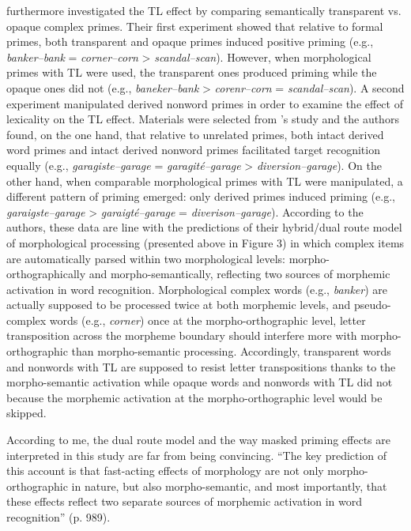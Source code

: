 \documentclass[output=paper]{langsci/langscibook}
\begin{document}
%
\citet{DiependaeleMorrisEtAl2013} %
%
furthermore investigated the TL effect by
comparing semantically transparent vs. opaque complex primes. Their first experiment showed that relative to formal primes, both transparent and opaque
primes induced positive priming (e.g., \emph{banker--bank} =
\emph{corner--corn} \textgreater{} \emph{scandal--scan}). However, when
morphological primes with TL were used, the transparent ones produced
priming while the opaque ones did not (e.g., \emph{baneker--bank} \textgreater{} \emph{corenr--corn} =
\emph{scandal--scan}). A second experiment manipulated derived nonword
primes in order to examine the effect of lexicality on the TL effect.
Materials were selected from %
\citeauthor{LongtinMeunier2005}'s \citeyear{LongtinMeunier2005} study %
%
%
 and the
authors found, on the one hand, that relative to unrelated primes, both
intact derived word primes and intact derived nonword primes 
facilitated target recognition equally (e.g., \emph{garagiste--garage} =
\emph{garagité--garage} \textgreater{} \emph{diversion--garage}). On the
other hand, when comparable morphological primes with TL were
manipulated, a different pattern of priming emerged: only derived primes
induced priming (e.g., \emph{garaigste--garage} \textgreater{}
\emph{garaigté--garage} = \emph{diverison--garage}). According to the
authors, these data are line with the predictions of their hybrid/dual
route model of morphological processing (presented above in Figure 3) in
which complex items are automatically parsed within two morphological
levels: morpho-orthographically and morpho-semantically, reflecting two
sources of morphemic activation in word recognition. Morphological
complex words (e.g., \emph{banker}) are actually supposed to be
processed twice at both morphemic levels, and pseudo-complex words (e.g.,
\emph{corner}) once at the morpho-orthographic level, letter
transposition across the morpheme boundary should interfere more with
morpho-orthographic  than morpho-semantic processing.
Accordingly, transparent words and nonwords with TL are supposed to
resist letter transpositions thanks to the morpho-semantic activation
while opaque words and nonwords with TL did not because the morphemic
activation at the morpho-orthographic level would be skipped.

According to me, the dual route model and the way masked priming effects
are interpreted in this study are far from being convincing. ``The key
prediction of this account is that fast-acting effects of morphology are
not only morpho-orthographic in nature, but also morpho-semantic, and
most importantly, that these effects reflect two separate sources of
morphemic activation in word recognition'' (p. 989).
\end{document}
